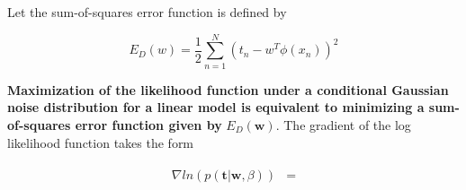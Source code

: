 Let the sum-of-squares error function is defined by

\begin{equation}
    E_D(w) = \frac{1}{2}\sum_{n=1}^N (t_n - w^T \phi (x_n))^2
\end{equation}

\textbf{Maximization of the likelihood function under a conditional Gaussian noise distribution for a linear model is equivalent to minimizing a sum-of-squares error function given by} $E_D(\pmb{w})$. The gradient of the log likelihood function takes the form

\begin{align}
    \begin{split}
        \nabla ln (p(\pmb{t} | \pmb{w}, \beta)) & = 
    \end{split}
\end{align}
